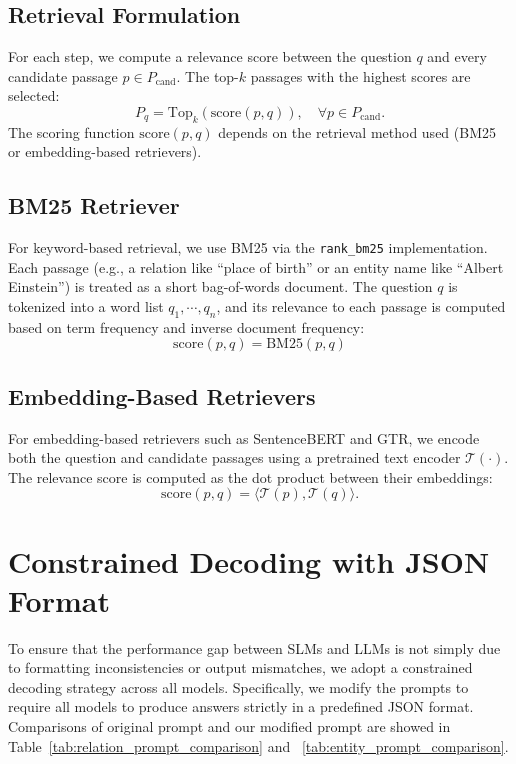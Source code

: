 \documentclass[11pt]{article}
\begin{document}
\subsection*{Retrieval Formulation}

For each step, we compute a relevance score between the question $q$ and every candidate passage $p \in P_{\text{cand}}$. The top-$k$ passages with the highest scores are selected:
\[
P_q = \text{Top}_k \left( \text{score}(p, q) \right), \quad \forall p \in P_{\text{cand}}.
\]
The scoring function $\text{score}(p, q)$ depends on the retrieval method used (BM25 or embedding-based retrievers).

\subsection*{BM25 Retriever}

For keyword-based retrieval, we use BM25 via the \texttt{rank\_bm25} implementation. Each passage (e.g., a relation like ``place of birth'' or an entity name like ``Albert Einstein'') is treated as a short bag-of-words document. The question $q$ is tokenized into a word list $q_1,\cdots,q_n$, and its relevance to each passage is computed based on term frequency and inverse document frequency:
\[
\text{score}(p, q) = \text{BM25}(p, q)
\]

\subsection*{Embedding-Based Retrievers}

For embedding-based retrievers such as SentenceBERT and GTR, we encode both the question and candidate passages using a pretrained text encoder $\mathcal{T}(\cdot)$. The relevance score is computed as the dot product between their embeddings:
\[
\text{score}(p, q) = \langle \mathcal{T}(p), \mathcal{T}(q) \rangle.
\]




\section{Constrained Decoding with JSON Format}
\label{sec:json}

To ensure that the performance gap between SLMs and LLMs is not simply due to formatting inconsistencies or output mismatches, we adopt a constrained decoding strategy across all models. Specifically, we modify the prompts to require all models to produce answers strictly in a predefined JSON format. Comparisons of original prompt and our modified prompt are showed in Table~\ref{tab:relation_prompt_comparison} and ~\ref{tab:entity_prompt_comparison}.
\end{document}
